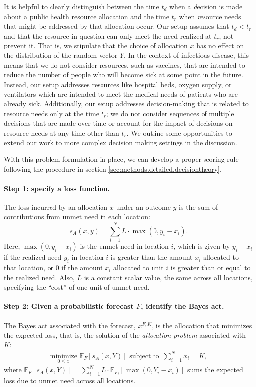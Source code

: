 \documentclass{article}\usepackage[]{graphicx}\usepackage[]{xcolor}
\begin{document}
It is helpful to clearly distinguish between the time $t_d$ when a \emph{d}ecision is made about a public health
resource allocation and the time $t_r$ when \emph{r}esource needs that might be addressed by that allocation occur. Our
setup assumes that $t_d < t_r$ and that the resource in question can only meet the need realized at $t_r$, not prevent
it. That is, we stipulate that the choice of allocation $x$ has no effect on the distribution of the random vector $Y$. In the
context of infectious disease, this means that we do not consider resources, such as vaccines, that are intended to
reduce the number of people who will become sick at some point in the future. Instead, our setup addresses resources
like hospital beds, oxygen supply, or ventilators which are intended to meet the medical needs of patients who are
already sick. Additionally, our setup addresses decision-making that is related to resource needs only at the time
$t_r$; we do not consider sequences of multiple decisions that are made over time or account for the impact of decisions
on resource needs at any time other than $t_r$. We outline some opportunities to extend our work to more complex
decision making settings in the discussion.

With this problem formulation in place, we can develop a proper scoring rule following the procedure in section
\ref{sec:methods.detailed.decisiontheory}.

\paragraph{Step 1: specify a loss function.} The loss incurred by an allocation $x$ under an outcome $y$ is the sum of
contributions from unmet need in each location:
\begin{equation}
  s_A(x, y) = \sum_{i=1}^N L \cdot \max(0, y_i - x_i). \label{eqn:loss_fn}
\end{equation}
Here, $\max(0, y_i - x_i)$ is the unmet need in location $i$, which is given by $y_i - x_i$ if the realized need $y_i$
in location $i$ is greater than the amount $x_i$ allocated to that location, or $0$ if the amount $x_i$ allocated to
unit $i$ is greater than or equal to the realized need. Also, $L$ is a constant scalar value, the same across all
locations, specifying the ``cost'' of one unit of unmet need.

\paragraph{Step 2: Given a probabilistic forecast $F$, identify the Bayes act.} The Bayes act associated with the
forecast, $x^{F,K}$, is the allocation that minimizes the expected loss, that is, the solution of the \emph{allocation
problem} associated with $K$:
\begin{align}
  \underset{0 \leq x}{\mathrm{minimize}}\,\, \mathbb{E}_{F} [s_A(x, Y)] \text{ subject to }
  \, \sum_{i=1}^N x_i = K, \label{AP}
\end{align}
where $\mathbb{E}_{F} [s_A(x, Y)] = \sum_{i=1}^{N} L \cdot \mathbb{E}_{F_i}[\max(0, Y_i - x_i)]$ sums the expected loss
due to unmet need across all locations.
\end{document}
